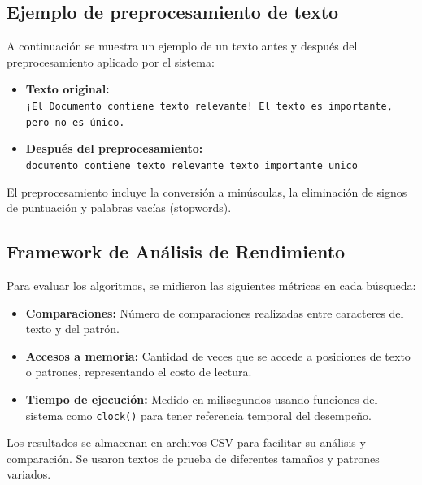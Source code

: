 \documentclass[9pt,letterpaper,onecolumn]{rho-class/rho}
\begin{document}

\subsection{Ejemplo de preprocesamiento de texto}

A continuación se muestra un ejemplo de un texto antes y después del preprocesamiento aplicado por el sistema:

\begin{itemize}
    \item \textbf{Texto original:}\\
    \texttt{¡El Documento contiene texto relevante! El texto es importante, pero no es único.}
    \item \textbf{Después del preprocesamiento:}\\
    \texttt{documento contiene texto relevante texto importante unico}
\end{itemize}

El preprocesamiento incluye la conversión a minúsculas, la eliminación de signos de puntuación y palabras vacías (stopwords).

\subsection{Framework de Análisis de Rendimiento}

Para evaluar los algoritmos, se midieron las siguientes métricas en cada búsqueda:

\begin{itemize}
    \item \textbf{Comparaciones:}  
    Número de comparaciones realizadas entre caracteres del texto y del patrón.

    \item \textbf{Accesos a memoria:}  
    Cantidad de veces que se accede a posiciones de texto o patrones, representando el costo de lectura.

    \item \textbf{Tiempo de ejecución:}  
    Medido en milisegundos usando funciones del sistema como \texttt{clock()} para tener referencia temporal del desempeño.
\end{itemize}

Los resultados se almacenan en archivos CSV para facilitar su análisis y comparación. Se usaron textos de prueba de diferentes tamaños y patrones variados.
\end{document}
